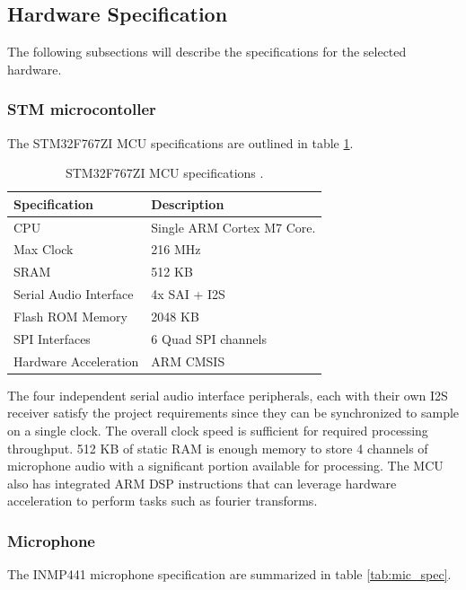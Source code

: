\documentclass[12pt, titlepage]{article}
\begin{document}
\subsection{Hardware Specification}
The following subsections will describe the specifications for the selected
hardware.

\subsubsection{STM microcontoller}

The STM32F767ZI MCU specifications are outlined in table \ref{tab:mcu_spec}.

\begin{table}[H]
    \centering
    \begin{tabularx}{\textwidth}{|X|X|}
        \hline
        \textbf{Specification} & \textbf{Description}\\ \hline
        CPU & Single ARM Cortex M7 Core. \\ \hline
        Max Clock & 216 MHz \\ \hline
        SRAM & 512 KB \\ \hline
        Serial Audio Interface & 4x SAI + I2S \\ \hline 
        Flash ROM Memory & 2048 KB \\ \hline
        SPI Interfaces & 6 Quad SPI channels \\ \hline
        Hardware Acceleration & ARM CMSIS \\ \hline
    \end{tabularx}
    \caption{STM32F767ZI MCU specifications \cite{STM_REFERENCE_MANUAL}.}
    \label{tab:mcu_spec}
\end{table}

The four independent serial audio interface peripherals, each with their own I2S
receiver satisfy the project requirements since they can be synchronized to
sample on a single clock. The overall clock speed is sufficient for required
processing throughput. 512 KB of static RAM is enough memory to store 4 channels
of microphone audio with a significant portion available for processing. The MCU
also has integrated ARM DSP instructions that can leverage hardware acceleration
to perform tasks such as fourier transforms.

\subsubsection{Microphone}
The INMP441 microphone specification are summarized in table \ref{tab:mic_spec}.
\end{document}
